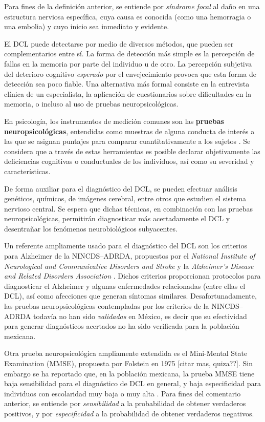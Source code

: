 Para fines de la definición anterior, se entiende por \textit{síndrome focal} al daño en una estructura nerviosa específica, cuya causa es conocida (como una hemorragia o una embolia) y cuyo inicio sea inmediato y evidente. 

El DCL puede detectarse por medio de diversos métodos, que pueden ser complementarios entre sí. 
%
La forma de detección más simple es la percepción de fallas en la memoria por parte del individuo u de otro. 
%
La percepción subjetiva del deterioro cognitivo \textit{esperado} por el envejecimiento provoca que esta forma de detección sea poco fiable.
%
Una alternativa más {formal} consiste en la entrevista clínica de un especialista, la aplicación de cuestionarios sobre dificultades en la memoria, o incluso al uso de pruebas neuropsicológicas. 

En psicología, los instrumentos de medición comunes son las \textbf{pruebas neuropsicológicas}, 
entendidas como muestras de alguna conducta de interés a las que se asignan puntajes para comparar 
cuantitativamente a los sujetos \cite{Ardila12}.
%
Se considera que a través de estas herramientas es posible declarar objetivamente las deficiencias cognitivas o conductuales de los individuos, así como su severidad y características.

De forma auxiliar para el diagnóstico del DCL, se pueden efectuar análisis genéticos, químicos, de imágenes cerebral, entre otros que estudien el sistema nervioso central.
%
Se espera que dichas técnicas, en combinación con las pruebas neuropsicológicas, permitirán diagnosticar más acertadamente el DCL y desentrañar los fenómenos neurobiológicos subyacentes.

Un referente ampliamente usado para el diagnóstico del DCL son los criterios para Alzheimer de la NINCDS--ADRDA, propuestos %
por el \textit{National Institute of Neurological and Communicative Disorders and Stroke} y la \textit{Alzheimer's Disease and Related Disorders Association} \cite{McKhann,Dubois07}. 
%
Dichos criterios proporcionan protocolos para diagnosticar el Alzheimer y algunas enfermedades relacionadas (entre ellas el DCL), así como afecciones que generan síntomas similares. 
%
Desafortunadamente, las pruebas neuropsicológicas contempladas por los criterios de la NINCDS--ADRDA todavía no han sido \textit{validadas} en México, es decir que su efectividad para generar diagnósticos acertados no ha sido verificada para la población mexicana. 

Otra prueba neuropsicológica ampliamente extendida es el Mini-Mental State Examination (MMSE), propuesta por Folstein en 1975 \cite{folstein75} [citar mas, quiza??].
%
Sin embargo se ha reportado que, en la población mexicana, la prueba MMSE tiene baja sensibilidad para el diagnóstico de DCL en general, y baja especificidad para individuos con escolaridad muy baja o muy alta \cite{Ostrosky00}.
%
Para fines del comentario anterior, se entiende por \textit{sensibilidad} a la probabilidad de obtener verdaderos positivos, y por \textit{especificidad} a la probabilidad de obtener verdaderos negativos.

